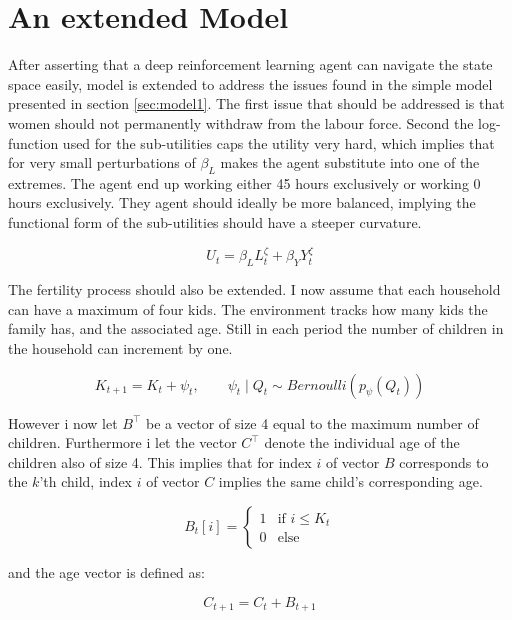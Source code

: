 \section{An extended Model}

After asserting that a deep reinforcement learning agent can navigate the state space easily, model is extended to address the issues found in the simple model presented in section \ref{sec:model1}. The first issue that should be addressed is that women should not permanently withdraw from the labour force. Second the log-function used for the sub-utilities caps the utility very hard, which implies that for very small perturbations of $\beta_L$ makes the agent substitute into one of the extremes. The agent end up working either 45 hours exclusively or working 0 hours exclusively. They agent should ideally be more balanced, implying the functional form of the sub-utilities should have a steeper curvature.

\begin{equation}
    U_t = \beta_L L_{t}^\zeta + \beta_Y Y_t^{\zeta}
\end{equation}

The fertility process should also be extended. I now assume that each household can have a maximum of four kids. The environment tracks how many kids the family has, and the associated age. Still in each period the number of children in the household can increment by one.

\begin{equation}
    K_{t+1} = K_t+ \psi_t, \qquad \psi_t \mid Q_t \sim Bernoulli (p_\psi(Q_t))
\end{equation}

However i now let $B^\top$ be a vector of size 4 equal to the maximum number of children. Furthermore i let the vector $C^\top$ denote the individual age of the children also of size 4. This implies that for index $i$ of vector $B$ corresponds to the $k$'th child, index $i$ of vector $C$ implies the same child's corresponding age.

\begin{equation}
    B_t[i]  = \begin{cases}
        1 & \text{if }  i \leq K_t \\
        0 & \text{else}
    \end{cases}
\end{equation}

and the age vector is defined as:

\begin{equation}
    C_{t+1} = C_t + B_{t+1}
\end{equation}

